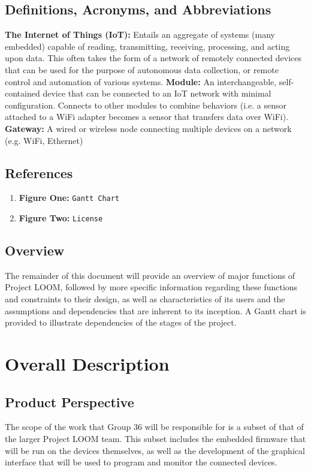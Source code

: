 \documentclass[onecolumn, draftclsnofoot,10pt, compsoc]{IEEEtran}
\begin{document}
	\subsection{Definitions, Acronyms, and Abbreviations}
	\textbf{The Internet of Things (IoT):} Entails an aggregate of systems (many embedded) capable of reading, transmitting, receiving, processing, and acting upon data. This often takes the form of a network of remotely connected devices that can be used for the purpose of autonomous data collection, or remote control and automation of various systems. \newline
	\textbf{Module:} An interchangeable, self-contained device that can be connected to an IoT network with minimal configuration. Connects to other modules to combine behaviors (i.e. a sensor attached to a WiFi adapter becomes a sensor that transfers data over WiFi). \newline
	\textbf{Gateway:} A wired or wireless node connecting multiple devices on a network (e.g. WiFi, Ethernet)

	\subsection{References}
	\begin{enumerate}
		\item \textbf{Figure One:} \texttt{Gantt Chart}
		\item \textbf{Figure Two:} \texttt{License}
	\end{enumerate}
	
	\subsection{Overview}
	The remainder of this document will provide an overview of major functions of Project LOOM, followed by more specific information regarding these functions and constraints to their design, as well as characteristics of its users and the assumptions and dependencies that are inherent to its inception. A Gantt chart is provided to illustrate dependencies of the stages of the project.

\section{Overall Description}
	\subsection{Product Perspective}
	The scope of the work that Group 36 will be responsible for is a subset of that of the larger Project LOOM team. This subset includes the embedded firmware that will be run on the devices themselves, as well as the development of the graphical interface that will be used to program and monitor the connected devices.
\end{document}
